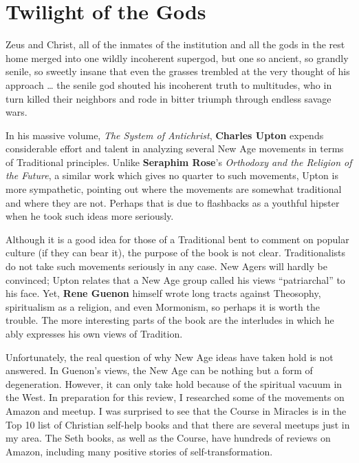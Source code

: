 \section{Twilight of the Gods}

\begin{quotex}
Zeus and Christ, all of the inmates of the institution and all the gods in the rest home merged into one wildly incoherent supergod, but one so ancient, so grandly senile, so sweetly insane that even the grasses trembled at the very thought of his approach … the senile god shouted his incoherent truth to multitudes, who in turn killed their neighbors and rode in bitter triumph through endless savage wars. 

\end{quotex}
In his massive volume, \emph{The System of Antichrist}, \textbf{Charles Upton} expends considerable effort and talent in analyzing several New Age movements in terms of Traditional principles. Unlike \textbf{Seraphim Rose}'s \emph{Orthodoxy and the Religion of the Future}, a similar work which gives no quarter to such movements, Upton is more sympathetic, pointing out where the movements are somewhat traditional and where they are not. Perhaps that is due to flashbacks as a youthful hipster when he took such ideas more seriously.

Although it is a good idea for those of a Traditional bent to comment on popular culture (if they can bear it), the purpose of the book is not clear. Traditionalists do not take such movements seriously in any case. New Agers will hardly be convinced; Upton relates that a New Age group called his views “patriarchal” to his face. Yet, \textbf{Rene Guenon} himself wrote long tracts against Theosophy, spiritualism as a religion, and even Mormonism, so perhaps it is worth the trouble. The more interesting parts of the book are the interludes in which he ably expresses his own views of Tradition.

Unfortunately, the real question of why New Age ideas have taken hold is not answered. In Guenon's views, the New Age can be nothing but a form of degeneration. However, it can only take hold because of the spiritual vacuum in the West. In preparation for this review, I researched some of the movements on Amazon and meetup. I was surprised to see that the Course in Miracles is in the Top 10 list of Christian self-help books and that there are several meetups just in my area. The Seth books, as well as the Course, have hundreds of reviews on Amazon, including many positive stories of self-transformation.

